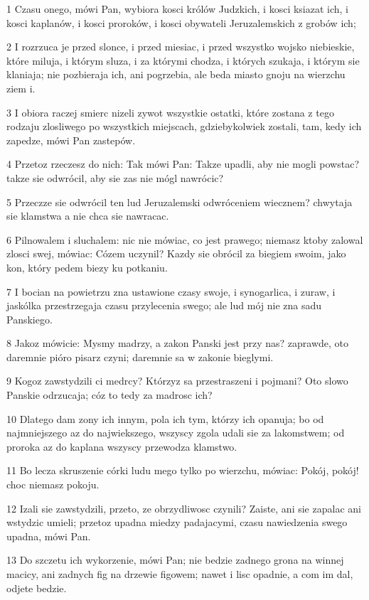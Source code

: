 \par 1 Czasu onego, mówi Pan, wybiora kosci królów Judzkich, i kosci ksiazat ich, i kosci kaplanów, i kosci proroków, i kosci obywateli Jeruzalemskich z grobów ich;
\par 2 I rozrzuca je przed slonce, i przed miesiac, i przed wszystko wojsko niebieskie, które miluja, i którym sluza, i za którymi chodza, i których szukaja, i którym sie klaniaja; nie pozbieraja ich, ani pogrzebia, ale beda miasto gnoju na wierzchu ziem i.
\par 3 I obiora raczej smierc nizeli zywot wszystkie ostatki, które zostana z tego rodzaju zlosliwego po wszystkich miejscach, gdziebykolwiek zostali, tam, kedy ich zapedze, mówi Pan zastepów.
\par 4 Przetoz rzeczesz do nich: Tak mówi Pan: Takze upadli, aby nie mogli powstac? takze sie odwrócil, aby sie zas nie mógl nawrócic?
\par 5 Przeczze sie odwrócil ten lud Jeruzalemski odwróceniem wiecznem? chwytaja sie klamstwa a nie chca sie nawracac.
\par 6 Pilnowalem i sluchalem: nic nie mówiac, co jest prawego; niemasz ktoby zalowal zlosci swej, mówiac: Cózem uczynil? Kazdy sie obrócil za biegiem swoim, jako kon, który pedem biezy ku potkaniu.
\par 7 I bocian na powietrzu zna ustawione czasy swoje, i synogarlica, i zuraw, i jaskólka przestrzegaja czasu przylecenia swego; ale lud mój nie zna sadu Panskiego.
\par 8 Jakoz mówicie: Mysmy madrzy, a zakon Panski jest przy nas? zaprawde, oto daremnie pióro pisarz czyni; daremnie sa w zakonie bieglymi.
\par 9 Kogoz zawstydzili ci medrcy? Którzyz sa przestraszeni i pojmani? Oto slowo Panskie odrzucaja; cóz to tedy za madrosc ich?
\par 10 Dlatego dam zony ich innym, pola ich tym, którzy ich opanuja; bo od najmniejszego az do najwiekszego, wszyscy zgola udali sie za lakomstwem; od proroka az do kaplana wszyscy przewodza klamstwo.
\par 11 Bo lecza skruszenie córki ludu mego tylko po wierzchu, mówiac: Pokój, pokój! choc niemasz pokoju.
\par 12 Izali sie zawstydzili, przeto, ze obrzydliwosc czynili? Zaiste, ani sie zapalac ani wstydzic umieli; przetoz upadna miedzy padajacymi, czasu nawiedzenia swego upadna, mówi Pan.
\par 13 Do szczetu ich wykorzenie, mówi Pan; nie bedzie zadnego grona na winnej macicy, ani zadnych fig na drzewie figowem; nawet i lisc opadnie, a com im dal, odjete bedzie.
